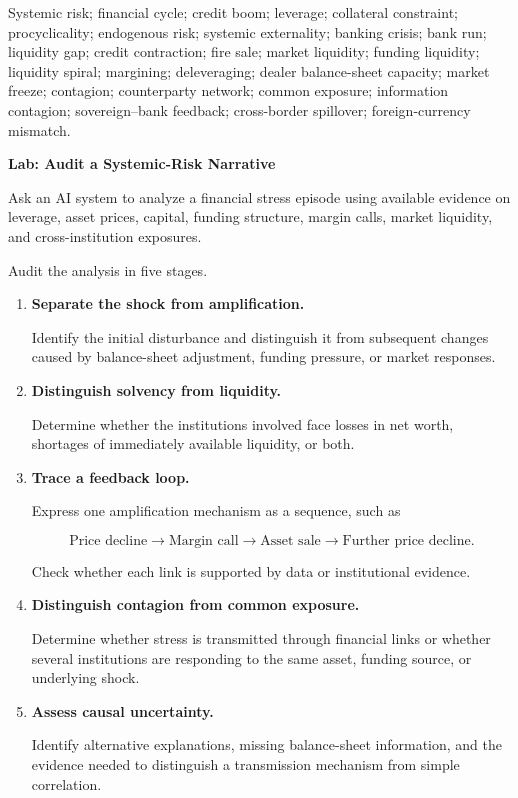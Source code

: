 
Systemic risk; financial cycle; credit boom; leverage;
collateral constraint; procyclicality; endogenous risk;
systemic externality; banking crisis; bank run; liquidity gap;
credit contraction; fire sale; market liquidity; funding liquidity;
liquidity spiral; margining; deleveraging; dealer balance-sheet capacity;
market freeze; contagion; counterparty network; common exposure;
information contagion; sovereign--bank feedback; cross-border spillover;
foreign-currency mismatch.




\textbf{Lab: Audit a Systemic-Risk Narrative}

Ask an AI system to analyze a financial stress episode using available evidence on leverage, asset prices, capital, funding structure, margin calls, market liquidity, and cross-institution exposures.

Audit the analysis in five stages.

\begin{enumerate}

\item \textbf{Separate the shock from amplification.}

Identify the initial disturbance and distinguish it from subsequent changes caused by balance-sheet adjustment, funding pressure, or market responses.

\item \textbf{Distinguish solvency from liquidity.}

Determine whether the institutions involved face losses in net worth, shortages of immediately available liquidity, or both.

\item \textbf{Trace a feedback loop.}

Express one amplification mechanism as a sequence, such as

\[
\text{Price decline}
\rightarrow
\text{Margin call}
\rightarrow
\text{Asset sale}
\rightarrow
\text{Further price decline}.
\]

Check whether each link is supported by data or institutional evidence.

\item \textbf{Distinguish contagion from common exposure.}

Determine whether stress is transmitted through financial links or whether several institutions are responding to the same asset, funding source, or underlying shock.

\item \textbf{Assess causal uncertainty.}

Identify alternative explanations, missing balance-sheet information, and the evidence needed to distinguish a transmission mechanism from simple correlation.

\end{enumerate}

